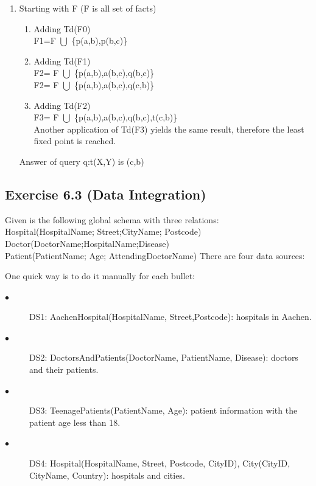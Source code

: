 \documentclass[10pt]{article}
\begin{document}
\begin{enumerate}
\begin{enumerate}
	        
	        \item Starting with F (F is all set of facts)
	        \begin{enumerate}
	        	\item Adding Td(F0)
	        	\\F1=F $\bigcup$ \{p(a,b),p(b,c)\}
	        	\item Adding Td(F1)
	        	\\F2= F $\bigcup$ \{p(a,b),a(b,c),q(b,c)\}
	        	\\F2= F $\bigcup$ \{p(a,b),a(b,c),q(c,b)\}
	        	\item Adding Td(F2)
	        	\\F3= F $\bigcup$ \{p(a,b),a(b,c),q(b,c),t(c,b)\}
	        	\\ Another application of Td(F3) yields the same result, therefore the least fixed point is reached.
	        \end{enumerate}
	        
	        
	        Answer of query q:t(X,Y) is (c,b)
	    \end{enumerate}
	\end{enumerate}
	
	\clearpage
	\subsection*{Exercise 6.3 (Data Integration)}
	Given is the following global schema with three relations:
	\\Hospital(HospitalName; Street;CityName; Postcode)
	\\Doctor(DoctorName;HospitalName;Disease)
	\\Patient(PatientName; Age; AttendingDoctorName)
	There are four data sources:
	
	One quick way is to do it manually for each bullet:
	
	\begin{description}
		\item[$\bullet$] DS1: AachenHospital(HospitalName, Street,Postcode): hospitals in Aachen.
		\item[$\bullet$] DS2: DoctorsAndPatients(DoctorName, PatientName, Disease): doctors and their patients.
		\item[$\bullet$]DS3: TeenagePatients(PatientName, Age): patient information with the patient age less
		than 18.
		\item[$\bullet$] DS4: Hospital(HospitalName, Street, Postcode, CityID), City(CityID, CityName, Country):
			hospitals and cities.
	\end{description}
\end{document}
